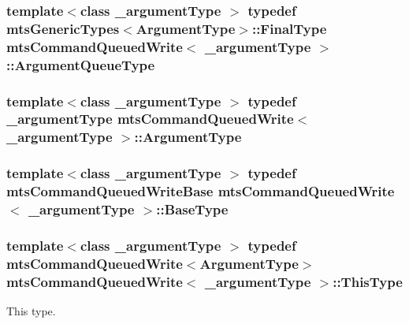 \subsubsection[{Argument\+Queue\+Type}]{\setlength{\rightskip}{0pt plus 5cm}template$<$class \+\_\+argument\+Type $>$ typedef {\bf mts\+Generic\+Types}$<${\bf Argument\+Type}$>$\+::Final\+Type {\bf mts\+Command\+Queued\+Write}$<$ \+\_\+argument\+Type $>$\+::{\bf Argument\+Queue\+Type}}\label{classmts_command_queued_write_a782b598b821585636a6a4f2039368b49}
\hypertarget{classmts_command_queued_write_a2f29807aedb1cbd9293f3f5bfbace404}{}
\subsubsection[{Argument\+Type}]{\setlength{\rightskip}{0pt plus 5cm}template$<$class \+\_\+argument\+Type $>$ typedef \+\_\+argument\+Type {\bf mts\+Command\+Queued\+Write}$<$ \+\_\+argument\+Type $>$\+::{\bf Argument\+Type}}\label{classmts_command_queued_write_a2f29807aedb1cbd9293f3f5bfbace404}
\hypertarget{classmts_command_queued_write_a45b3d0b46248285d3535ad64ee93a28d}{}
\subsubsection[{Base\+Type}]{\setlength{\rightskip}{0pt plus 5cm}template$<$class \+\_\+argument\+Type $>$ typedef {\bf mts\+Command\+Queued\+Write\+Base} {\bf mts\+Command\+Queued\+Write}$<$ \+\_\+argument\+Type $>$\+::{\bf Base\+Type}}\label{classmts_command_queued_write_a45b3d0b46248285d3535ad64ee93a28d}
\hypertarget{classmts_command_queued_write_aff1e774ee1a65b26df3a2924f8a9bff6}{}
\subsubsection[{This\+Type}]{\setlength{\rightskip}{0pt plus 5cm}template$<$class \+\_\+argument\+Type $>$ typedef {\bf mts\+Command\+Queued\+Write}$<${\bf Argument\+Type}$>$ {\bf mts\+Command\+Queued\+Write}$<$ \+\_\+argument\+Type $>$\+::{\bf This\+Type}}\label{classmts_command_queued_write_aff1e774ee1a65b26df3a2924f8a9bff6}
This type. 

